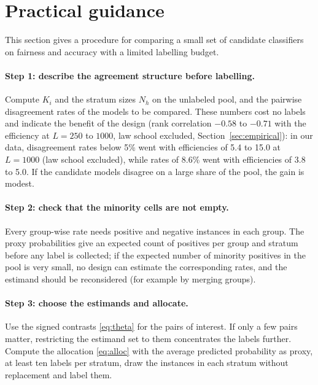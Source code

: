 \documentclass[pdflatex,sn-mathphys-num,iicol]{sn-jnl}
\theoremstyle{thmstyleone}
\theoremstyle{thmstyletwo}
\theoremstyle{thmstylethree}
\begin{document}
\section{Practical guidance}\label{sec:guidance}

This section gives a procedure for comparing a small set of candidate classifiers on fairness and accuracy with a limited labelling budget.

\paragraph{Step 1: describe the agreement structure before labelling.} Compute $K_i$ and the stratum sizes $N_h$ on the unlabeled pool, and the pairwise disagreement rates of the models to be compared. These numbers cost no labels and indicate the benefit of the design (rank correlation $-0.58$ to $-0.71$ with the efficiency at $L=250$ to $1000$, law school excluded, Section~\ref{sec:empirical}): in our data, disagreement rates below 5\% went with efficiencies of 5.4 to 15.0 at $L=1000$ (law school excluded), while rates of 8.6\% went with efficiencies of 3.8 to 5.0. If the candidate models disagree on a large share of the pool, the gain is modest.

\paragraph{Step 2: check that the minority cells are not empty.} Every group-wise rate needs positive and negative instances in each group. The proxy probabilities give an expected count of positives per group and stratum before any label is collected; if the expected number of minority positives in the pool is very small, no design can estimate the corresponding rates, and the estimand should be reconsidered (for example by merging groups).

\paragraph{Step 3: choose the estimands and allocate.} Use the signed contrasts \eqref{eq:theta} for the pairs of interest. If only a few pairs matter, restricting the estimand set to them concentrates the labels further. Compute the allocation \eqref{eq:alloc} with the average predicted probability as proxy, at least ten labels per stratum, draw the instances in each stratum without replacement and label them.
\end{document}
